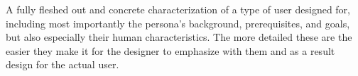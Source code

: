 \begin{tool}[Persona] \label{tool:persona} 
  A fully fleshed out and concrete characterization of a type of user designed for, including most importantly the persona's background, prerequisites, and goals, but also especially their human characteristics. The more detailed these are the easier they make it for the designer to emphasize with them and as a result design for the actual user. \cite[p. 55]{benyon_14}
\end{tool}